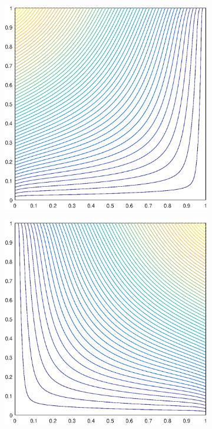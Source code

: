 \begin{figure}
\label{fig::2D_MV1_unit_square_basis_functions}
\centering
	\begin{subfigure}[b]{0.35\textwidth}
		\centering
		\includegraphics[width=\textwidth]{figures/sec_BF/square_MV1_contour_b4.eps}
		\caption{}
	\end{subfigure}
	\hspace{1cm}
	\begin{subfigure}[b]{0.35\textwidth}
		\centering
		\includegraphics[width=\textwidth]{figures/sec_BF/square_MV1_contour_b3.eps}

\end{subfigure}
\end{figure}
